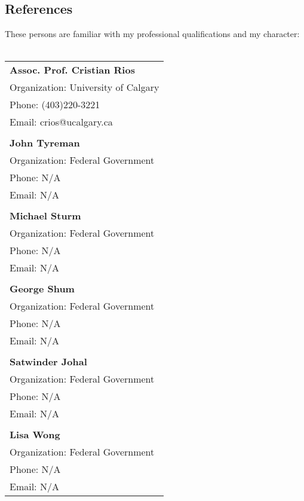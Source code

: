 \documentclass[12pt]{article}
\begin{document}
\subsection*{References}
These persons are familiar with my professional qualifications and my character:\\
\\
\begin{tabular}{l}
	\textbf{Assoc. Prof. Cristian Rios}\\
	Organization: University of Calgary\\
	Phone: (403)220-3221\\
	Email: crios@ucalgary.ca\\
	\\
	\textbf{John Tyreman}\\
	Organization: Federal Government\\
	Phone: N/A\\
	Email: N/A\\
	\\
	\textbf{Michael Sturm}\\
	Organization: Federal Government\\
	Phone: N/A\\
	Email: N/A\\
	\\
	\textbf{George Shum}\\
	Organization: Federal Government\\
	Phone: N/A\\
	Email: N/A\\
	\\
	\textbf{Satwinder Johal}\\
	Organization: Federal Government\\
	Phone: N/A\\
	Email: N/A\\
	\\
	\textbf{Lisa Wong}\\
	Organization: Federal Government\\
	Phone: N/A\\
	Email: N/A\\
\end{tabular}
\end{document}
